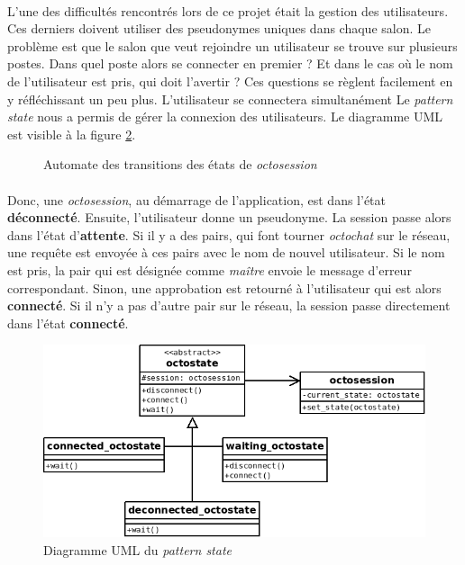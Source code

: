 \documentclass[a4paper]{article}
\begin{document}
			\paragraph{}{
			L'une des difficultés rencontrés lors de ce projet était la gestion des utilisateurs. Ces derniers doivent
			utiliser des pseudonymes uniques dans chaque salon. Le problème est que le salon que veut rejoindre un utilisateur
			se trouve sur plusieurs postes. Dans quel poste alors se connecter en premier ? Et dans le cas où le nom
			de l'utilisateur est pris, qui doit l'avertir ? Ces questions se règlent facilement en y réfléchissant un peu plus.
			L'utilisateur se connectera simultanément
			Le \textit{pattern state} nous a permis de gérer la connexion des utilisateurs. Le diagramme UML est visible à la figure \ref{state_uml}.
			}
			
			\begin{figure}[!h]
				\centering
				
				\caption{\label{state_schema} Automate des transitions des états de \textit{octosession}}
			\end{figure}
			
			\paragraph{}{
			Donc, une \textit{octosession}, au démarrage de l'application, est dans l'état \textbf{déconnecté}.
			Ensuite, l'utilisateur donne un pseudonyme. La session passe alors dans l'état d'\textbf{attente}.
			Si il y a des pairs, qui font tourner \textit{octochat} sur le réseau, une requête est envoyée à ces pairs 
			avec le nom de nouvel utilisateur. Si le nom est pris, la pair qui est désignée comme \textit{maître} 
			envoie le message d'erreur correspondant. Sinon, une approbation est retourné à l'utilisateur qui est 
			alors \textbf{connecté}. \newline
			Si il n'y a pas d'autre pair sur le réseau, la session passe directement dans l'état \textbf{connecté}.
			}
			
			\begin{figure}
				\centering
				\includegraphics[scale=0.6]{UML/state.png}
				\caption{\label{state_uml} Diagramme UML du \textit{pattern state}}
			\end{figure}
			
\end{document}
